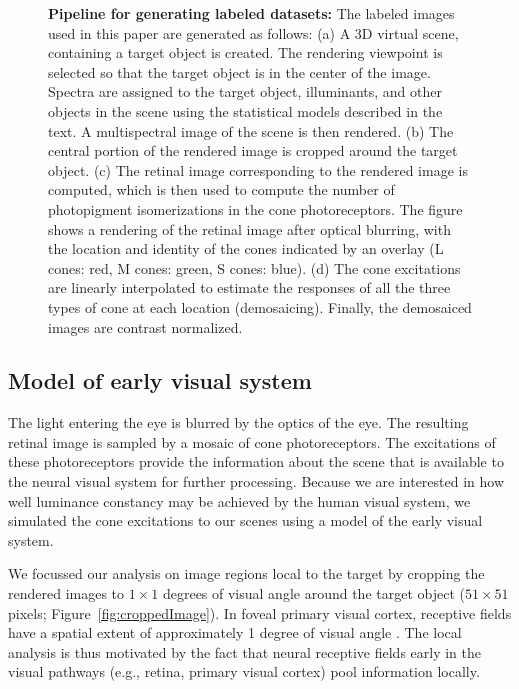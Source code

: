 \documentclass{jov}
\begin{document}
\begin{figure}
\begin{subfigure}[b]{0.2 \textwidth}
        \label{fig:coneContrast}
    \end{subfigure}
    \label{fig:sceneWithCroppedImage}
    \caption{{\bf Pipeline for generating labeled datasets:}  The labeled images used in this paper are generated as follows: (a) A 3D virtual scene, containing a target object is created. The rendering viewpoint is selected so that the target object is in the center of the image. Spectra are assigned to the target object, illuminants, and other objects in the scene using the statistical models described in the text. A multispectral image of the scene is then rendered. (b) The central portion of the rendered image is cropped around the target object. (c) The retinal image corresponding to the rendered image is computed, which is then used to compute the number of photopigment isomerizations in the cone photoreceptors. The figure shows a rendering of the retinal image after optical blurring, with the location and identity of the cones indicated by an overlay (L cones: red, M cones: green, S cones: blue).  (d) The cone excitations are linearly interpolated to estimate the responses of all the three types of cone at each location (demosaicing). Finally, the demosaiced images are contrast normalized.}
\end{figure}

\subsection{Model of early visual system} \label{method:Isetbio}
The light entering the eye is blurred by the optics of the eye.
The resulting retinal image is sampled by a mosaic of cone photoreceptors.
The excitations of these photoreceptors provide the information about the scene that is available to the neural visual system for further processing.
Because we are interested in how well luminance constancy may be achieved by the human visual system, we simulated the cone excitations
to our scenes using a model of the early visual system.

We focussed our analysis on image regions local to the target by cropping the rendered images to $1 \times 1$ degrees of visual angle around the target object ($51 \times 51$ pixels; Figure~\ref{fig:croppedImage}). In foveal primary visual cortex, receptive fields have a spatial extent of approximately 1 degree of visual angle \cite{gattass1981visual, gattass1988visuotopic}. 
The local analysis is thus motivated by the fact that neural receptive fields early in the visual pathways (e.g., retina, primary visual cortex) pool information locally.
\end{document}
